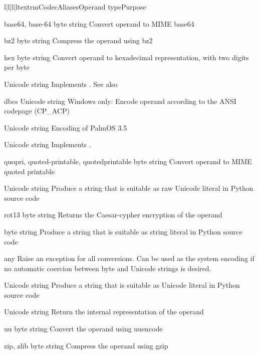 \begin{tableiv}{l|l|l|l}{textrm}{Codec}{Aliases}{Operand type}{Purpose}

         {base64, base-64}
         {byte string}
         {Convert operand to MIME base64}

         {bz2}
         {byte string}
         {Compress the operand using bz2}

         {hex}
         {byte string}
         {Convert operand to hexadecimal representation, with two
          digits per byte}

         {}
         {Unicode string}
         {Implements .
          See also }

         {dbcs}
         {Unicode string}
         {Windows only: Encode operand according to the ANSI codepage (CP_ACP)}

         {}
         {Unicode string}
         {Encoding of PalmOS 3.5}

         {}
         {Unicode string}
         {Implements .
          }

         {quopri, quoted-printable, quotedprintable}
         {byte string}
         {Convert operand to MIME quoted printable}

         {}
         {Unicode string}
         {Produce a string that is suitable as raw Unicode literal in
          Python source code}

         {rot13}
         {byte string}
         {Returns the Caesar-cypher encryption of the operand}

         {}
         {byte string}
         {Produce a string that is suitable as string literal in
          Python source code}

         {}
         {any}
         {Raise an exception for all conversions. Can be used as the
          system encoding if no automatic coercion between byte and
          Unicode strings is desired.} 

         {}
         {Unicode string}
         {Produce a string that is suitable as Unicode literal in
          Python source code}

         {}
         {Unicode string}
         {Return the internal representation of the operand}

         {uu}
         {byte string}
         {Convert the operand using uuencode}

         {zip, zlib}
         {byte string}
         {Compress the operand using gzip}

\end{tableiv}

